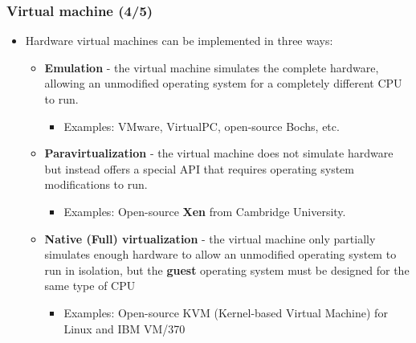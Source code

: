 \documentclass[CJKutf8,xcolor=pdftex,dvipsnames,table]{beamer}
\begin{document}
\begin{CJK*}{UTF8}{song}
  \begin{frame}
    \frametitle{Virtual machine (4/5)} \pause
    \begin{itemize}
    \item{Hardware virtual machines can be implemented in three ways:} \pause
      \begin{itemize}
      \item{\textbf{Emulation} \pause - the virtual machine simulates the complete hardware, allowing an unmodified operating system for a completely different CPU to run.} \pause
        \begin{itemize}
        \item{Examples: VMware, VirtualPC, open-source Bochs, etc.} \pause
        \end{itemize}
      \item{\textbf{Paravirtualization} \pause - the virtual machine does not simulate hardware but instead offers a special API that requires operating system modifications to run.} \pause
        \begin{itemize}
        \item{Examples: Open-source \textbf{Xen} from Cambridge University.} \pause
        \end{itemize}
      \item{\textbf{Native (Full) virtualization} \pause - the virtual machine only partially simulates enough hardware to allow an unmodified operating system to run in isolation, but the \textbf{guest} operating system must be designed for the same type of CPU} \pause
        \begin{itemize}
        \item{Examples: Open-source KVM (Kernel-based Virtual Machine) for Linux and IBM VM/370}
        \end{itemize}
      \end{itemize}
    \end{itemize}
  \end{frame}

  \fi
  

\end{CJK*}
\end{document}
